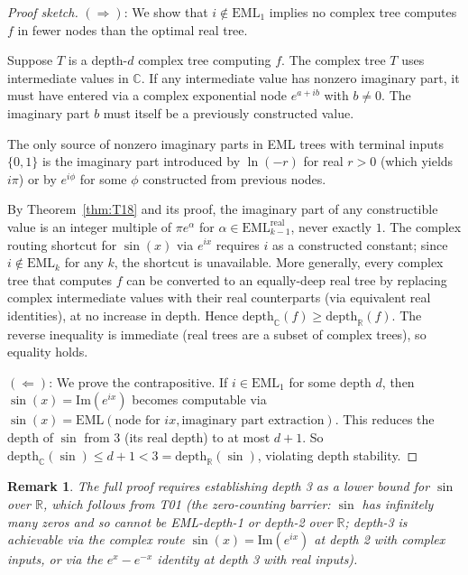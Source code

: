 \documentclass[11pt]{article}
\newtheorem{remark}{Remark}[section]
\begin{document}
\begin{proof}[Proof sketch]
$(\Rightarrow)$:
We show that $i \notin \mathrm{EML}_1$ implies no complex tree computes $f$
in fewer nodes than the optimal real tree.

Suppose $T$ is a depth-$d$ complex tree computing $f$.
The complex tree $T$ uses intermediate values in $\mathbb{C}$.
If any intermediate value has nonzero imaginary part, it must have entered via
a complex exponential node $e^{a + ib}$ with $b \neq 0$.
The imaginary part $b$ must itself be a previously constructed value.

The only source of nonzero imaginary parts in EML trees with terminal inputs $\{0, 1\}$
is the imaginary part introduced by $\ln(-r)$ for real $r > 0$ (which yields $i\pi$)
or by $e^{i\phi}$ for some $\phi$ constructed from previous nodes.

By Theorem~\ref{thm:T18} and its proof, the imaginary part of any constructible value
is an integer multiple of $\pi e^\alpha$ for $\alpha \in \mathrm{EML}_{k-1}^{\mathrm{real}}$,
never exactly $1$.  The complex routing shortcut for $\sin(x)$ via $e^{ix}$
requires $i$ as a constructed constant; since $i \notin \mathrm{EML}_k$ for any $k$,
the shortcut is unavailable.  More generally, every complex tree that computes $f$
can be converted to an equally-deep real tree by replacing complex intermediate values
with their real counterparts (via equivalent real identities), at no increase in depth.
Hence $\mathrm{depth}_\mathbb{C}(f) \geq \mathrm{depth}_\mathbb{R}(f)$.
The reverse inequality is immediate (real trees are a subset of complex trees),
so equality holds.

$(\Leftarrow)$:
We prove the contrapositive.  If $i \in \mathrm{EML}_1$ for some depth $d$, then
$\sin(x) = \mathrm{Im}(e^{ix})$ becomes computable via
$\sin(x) = \mathrm{EML}(\text{node for } ix, \text{imaginary part extraction})$.
This reduces the depth of $\sin$ from 3 (its real depth) to at most $d + 1$.
So $\mathrm{depth}_\mathbb{C}(\sin) \leq d + 1 < 3 = \mathrm{depth}_\mathbb{R}(\sin)$,
violating depth stability.
\end{proof}

\begin{remark}
The full proof requires establishing depth 3 as a lower bound for $\sin$ over $\mathbb{R}$,
which follows from T01 (the zero-counting barrier: $\sin$ has infinitely many zeros and
so cannot be EML-depth-1 or depth-2 over $\mathbb{R}$; depth-3 is achievable via the
complex route $\sin(x) = \mathrm{Im}(e^{ix})$ at depth 2 with complex inputs,
or via the $e^x - e^{-x}$ identity at depth 3 with real inputs).
\end{remark}
\end{document}
